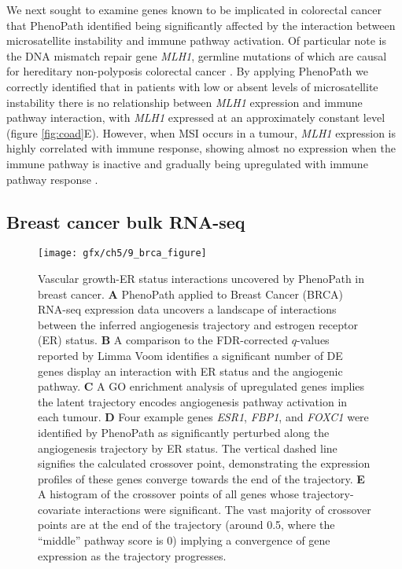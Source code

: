 We next sought to examine genes known to be implicated in colorectal cancer that PhenoPath identified being significantly affected by the interaction between microsatellite instability and immune pathway activation. Of particular note is the DNA mismatch repair gene \emph{MLH1}, germline mutations of which are causal for hereditary non-polyposis colorectal cancer \cite{Bonadona2011-ml,Gille2002-rx}. By applying PhenoPath we correctly identified that in patients with low or absent levels of microsatellite instability there is no relationship between \emph{MLH1} expression and immune pathway interaction, with \emph{MLH1} expressed at an approximately constant level (figure  \ref{fig:coad}E). However, when MSI occurs in a tumour, \emph{MLH1} expression is highly correlated with immune response, showing almost no expression when the immune pathway is inactive and gradually being upregulated with immune pathway response \cite{michel2008high}.

\subsection{Breast cancer bulk RNA-seq} \label{sec:brca}

\begin{figure}
\texttt{[image: gfx/ch5/9\_brca\_figure]}
\caption{Vascular growth-ER status interactions uncovered by PhenoPath in breast cancer.
\textbf{A} PhenoPath applied to Breast Cancer (BRCA) RNA-seq expression data uncovers a landscape of interactions between the inferred angiogenesis trajectory and estrogen receptor (ER) status.
\textbf{B} A comparison to the FDR-corrected $q$-values reported by Limma Voom identifies a significant number of DE genes display an interaction with ER status and the angiogenic pathway.
\textbf{C} A GO enrichment analysis of upregulated genes implies the latent trajectory encodes angiogenesis pathway activation in each tumour.
\textbf{D} Four example genes \emph{ESR1}, \emph{FBP1}, and \emph{FOXC1} were identified by PhenoPath as significantly perturbed along the angiogenesis trajectory by ER status. The vertical dashed line signifies the calculated crossover point, demonstrating the expression profiles of these genes converge towards the end of the trajectory.
\textbf{E} A histogram of the crossover points of all genes whose trajectory-covariate interactions were significant. The vast majority of crossover points are at the end of the trajectory (around 0.5, where the ``middle'' pathway score is 0) implying a convergence of gene expression as the trajectory progresses.
} \label{fig:brca}
\end{figure}


